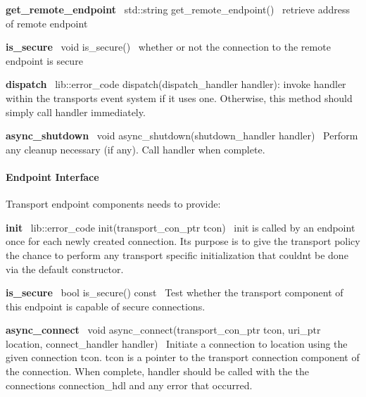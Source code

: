 {\bfseries get\+\_\+remote\+\_\+endpoint}~\newline
{\ttfamily std\+::string get\+\_\+remote\+\_\+endpoint()}~\newline
retrieve address of remote endpoint

{\bfseries is\+\_\+secure}~\newline
{\ttfamily void is\+\_\+secure()}~\newline
whether or not the connection to the remote endpoint is secure

{\bfseries dispatch}~\newline
{\ttfamily lib\+::error\+\_\+code dispatch(dispatch\+\_\+handler handler)}\+: invoke handler within the transport\textquotesingle{}s event system if it uses one. Otherwise, this method should simply call {\ttfamily handler} immediately.

{\bfseries async\+\_\+shutdown}~\newline
{\ttfamily void async\+\_\+shutdown(shutdown\+\_\+handler handler)}~\newline
Perform any cleanup necessary (if any). Call {\ttfamily handler} when complete.

\paragraph*{Endpoint Interface}

Transport endpoint components needs to provide\+:

{\bfseries init}~\newline
{\ttfamily lib\+::error\+\_\+code init(transport\+\_\+con\+\_\+ptr tcon)}~\newline
init is called by an endpoint once for each newly created connection. It\textquotesingle{}s purpose is to give the transport policy the chance to perform any transport specific initialization that couldn\textquotesingle{}t be done via the default constructor.

{\bfseries is\+\_\+secure}~\newline
{\ttfamily bool is\+\_\+secure() const}~\newline
Test whether the transport component of this endpoint is capable of secure connections.

{\bfseries async\+\_\+connect}~\newline
{\ttfamily void async\+\_\+connect(transport\+\_\+con\+\_\+ptr tcon, uri\+\_\+ptr location, connect\+\_\+handler handler)}~\newline
Initiate a connection to {\ttfamily location} using the given connection {\ttfamily tcon}. {\ttfamily tcon} is a pointer to the transport connection component of the connection. When complete, {\ttfamily handler} should be called with the the connection\textquotesingle{}s {\ttfamily connection\+\_\+hdl} and any error that occurred.

